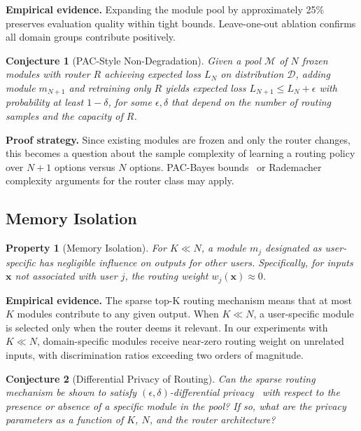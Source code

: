 \documentclass[11pt,a4paper]{article}
\newtheorem{property}{Property}
\newtheorem{conjecture}{Conjecture}
\begin{document}
\noindent\textbf{Empirical evidence.} Expanding the module pool by approximately 25\% preserves evaluation quality within tight bounds. Leave-one-out ablation confirms all domain groups contribute positively.

\begin{conjecture}[PAC-Style Non-Degradation]
Given a pool $\mathcal{M}$ of $N$ frozen modules with router $R$ achieving expected loss $L_N$ on distribution $\mathcal{D}$, adding module $m_{N+1}$ and retraining only $R$ yields expected loss $L_{N+1} \leq L_N + \epsilon$ with probability at least $1 - \delta$, for some $\epsilon, \delta$ that depend on the number of routing samples and the capacity of $R$.
\end{conjecture}

\noindent\textbf{Proof strategy.} Since existing modules are frozen and only the router changes, this becomes a question about the sample complexity of learning a routing policy over $N+1$ options versus $N$ options. PAC-Bayes bounds~\cite{valiant1984theory} or Rademacher complexity arguments for the router class may apply.

\subsection{Memory Isolation}
\label{sec:isolation}

\begin{property}[Memory Isolation]
For $K \ll N$, a module $m_j$ designated as user-specific has negligible influence on outputs for other users. Specifically, for inputs $\mathbf{x}$ not associated with user $j$, the routing weight $w_j(\mathbf{x}) \approx 0$.
\end{property}

\noindent\textbf{Empirical evidence.} The sparse top-K routing mechanism means that at most $K$ modules contribute to any given output. When $K \ll N$, a user-specific module is selected only when the router deems it relevant. In our experiments with $K \ll N$, domain-specific modules receive near-zero routing weight on unrelated inputs, with discrimination ratios exceeding two orders of magnitude.

\begin{conjecture}[Differential Privacy of Routing]
Can the sparse routing mechanism be shown to satisfy $(\epsilon, \delta)$-differential privacy~\cite{dwork2014algorithmic} with respect to the presence or absence of a specific module in the pool? If so, what are the privacy parameters as a function of $K$, $N$, and the router architecture?
\end{conjecture}
\end{document}
